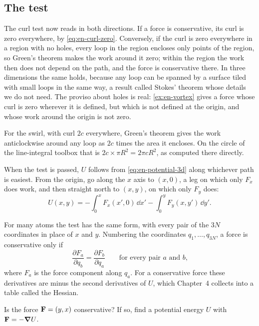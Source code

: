 \subsection*{The test}

The curl test now reads in both directions. If a force is conservative,
its curl is zero everywhere, by \cref{eq:en-curl-zero}. Conversely, if
the curl is zero everywhere in a region with no holes, every loop in the
region encloses only points of the region, so Green's theorem makes the
work around it zero; within the region the work then does not depend on
the path, and the force is conservative there. In three dimensions
the same holds, because any loop can be spanned by a surface tiled with
small loops in the same way, a result called Stokes' theorem whose details
we do not need. The proviso about holes is real: \cref{ex:en-vortex} gives
a force whose curl is zero wherever it is defined, but which is not
defined at the origin, and whose work around the origin is not zero.

For the swirl, with curl $2c$ everywhere, Green's theorem gives the work
anticlockwise around any loop as $2c$ times the area it encloses. On the
circle of the line-integral toolbox that is $2c\times\pi R^2 = 2\pi
cR^2$, as computed there directly.

When the test is passed, $U$ follows from \cref{eq:en-potential-3d} along
whichever path is easiest. From the origin, go along the $x$ axis to $(x,
0)$, a leg on which only $F_x$ does work, and then straight north to $(x,
y)$, on which only $F_y$ does:
\begin{equation*}
   U(x, y) = -\int_0^x F_x(x', 0)\,\dd x' - \int_0^y F_y(x, y')\,\dd y' .
\end{equation*}

For many atoms the test has the same form, with every pair of the $3N$
coordinates in place of $x$ and $y$. Numbering the coordinates $q_1,
\dots, q_{3N}$, a force is conservative only if
\begin{equation*}
   \frac{\partial F_a}{\partial q_b} = \frac{\partial F_b}{\partial q_a}
   \qquad\text{for every pair $a$ and $b$,}
\end{equation*}
where $F_a$ is the force component along $q_a$. For a conservative
force these derivatives are minus the second derivatives of $U$, which
Chapter~4 collects into a table called the Hessian.


\begin{selfcheck}
Is the force $\bm{\mathrm{F}} = (y, x)$ conservative? If so, find a potential
energy $U$ with $\bm{\mathrm{F}} = -\bm{\nabla} U$.
\end{selfcheck}
